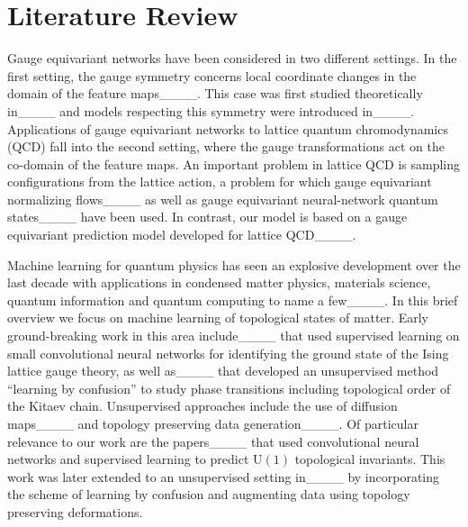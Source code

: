 \section{Literature Review}
Gauge equivariant networks have been considered in two different settings. In the first setting, the gauge symmetry concerns local coordinate changes in the domain of the feature maps____. This case was first studied theoretically in____ and models respecting this symmetry were introduced in____. Applications of gauge equivariant networks to lattice quantum chromodynamics (QCD) fall into the second setting, where the gauge transformations act on the co-domain of the feature maps. An important problem in lattice QCD is sampling configurations from the lattice action, a problem for which gauge equivariant normalizing flows____ as well as gauge equivariant neural-network quantum states____ have been used. In contrast, our model is based on a gauge equivariant prediction model developed for lattice QCD____.


Machine learning for quantum physics has seen an explosive development over the last decade with applications in condensed matter physics, materials science, quantum information and quantum computing to name a few____.  In this brief overview we focus on machine learning of topological states of matter. Early ground-breaking work in this area include____ that used supervised learning on small convolutional neural networks for identifying the ground state of the Ising lattice gauge theory, as well as____ that developed an unsupervised method “learning by confusion” to study phase transitions including topological order of the Kitaev chain. Unsupervised approaches include the use of diffusion maps____ and topology preserving data generation____. Of particular relevance to our work are the papers____ that used convolutional neural networks and supervised learning to predict $\mathrm{U}(1)$ topological invariants.
This work was later extended to an unsupervised setting in____ by incorporating the scheme of learning by confusion and augmenting data using topology preserving deformations. 
